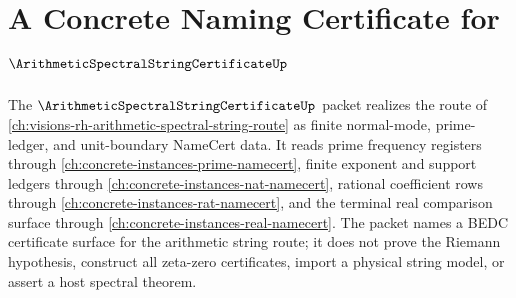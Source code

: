 \chapter{A Concrete Naming Certificate for $\ArithmeticSpectralStringCertificateUp$}
\label{ch:concrete-instances-arithmetic-spectral-string-certificate-namecert}

The $\ArithmeticSpectralStringCertificateUp$ packet realizes the route of \autoref{ch:visions-rh-arithmetic-spectral-string-route} as finite normal-mode, prime-ledger, and unit-boundary NameCert data. It reads prime frequency registers through \autoref{ch:concrete-instances-prime-namecert}, finite exponent and support ledgers through \autoref{ch:concrete-instances-nat-namecert}, rational coefficient rows through \autoref{ch:concrete-instances-rat-namecert}, and the terminal real comparison surface through \autoref{ch:concrete-instances-real-namecert}. The packet names a BEDC certificate surface for the arithmetic string route; it does not prove the Riemann hypothesis, construct all zeta-zero certificates, import a physical string model, or assert a host spectral theorem.

